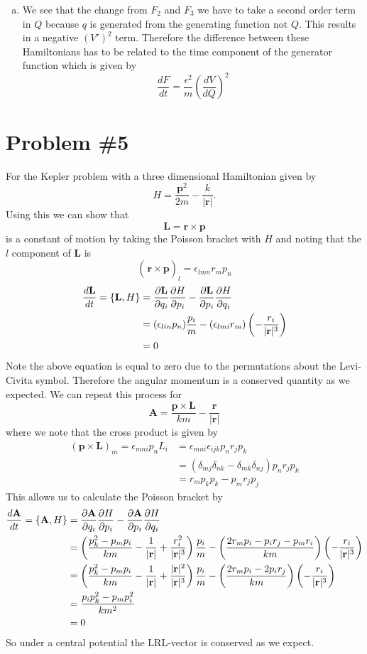 \documentclass[11pt]{article}
\numberwithin{equation}{section}
\begin{document}
\begin{enumerate}[(a)]
\item We see that the change from $F_2$ and $F_3$ we have to take a second order term in $Q$
because $q$ is generated from the generating function not $Q$. This results in a negative 
$(V')^2$ term. Therefore the difference between these Hamiltonians has to be related to the
time component of the generator function which is given by
$$\frac{dF}{dt} = \frac{\epsilon^2}{m}\left(\frac{dV}{dQ}\right)^2$$

\end{enumerate}

\pagebreak

\section{Problem \#5}
For the Kepler problem with a three dimensional Hamiltonian given by
$$H = \frac{\mathbf{p}^2}{2m} - \frac{k}{|\mathbf{r}|}.$$
Using this we can show that 
$$\mathbf{L} = \mathbf{r}\times\mathbf{p}$$
is a constant of motion by taking the Poisson bracket with $H$ and noting that the $l$ 
component of $\mathbf{L}$ is
$$\left(\frac{}{}\mathbf{r}\times\mathbf{p}\right)_{l} = \epsilon_{lmn}r_mp_n$$
\begin{align*}
\frac{d\mathbf{L}}{dt} = \{\mathbf{L},H\} &= \frac{\partial{\mathbf{L}}}{\partial{q_i}}\frac{\partial{H}}{\partial{p_i}} - \frac{\partial{\mathbf{L}}}{\partial{p_i}}\frac{\partial{H}}{\partial{q_i}}\\
&= (\epsilon_{lin}p_n)\frac{p_i}{m} - (\epsilon_{lmi}r_m)\left(-\frac{r_i}{|\mathbf{r}|^3}\right)\\
&= 0
\end{align*}
Note the above equation is equal to zero due to the permutations about the Levi-Civita 
symbol. Therefore the angular momentum is a conserved quantity as we expected. We can repeat
this process for 
$$\mathbf{A} = \frac{\mathbf{p}\times\mathbf{L}}{km} - \frac{\mathbf{r}}{|\mathbf{r}|}$$
where we note that the cross product is given by
\begin{align*}
(\mathbf{p}\times\mathbf{L})_m = \epsilon_{mni}p_nL_i &= \epsilon_{mni}\epsilon_{ijk}p_nr_jp_k \\
&= (\delta_{mj}\delta_{nk}-\delta_{mk}\delta_{nj})p_nr_jp_k\\
&= r_mp_kp_k - p_mr_jp_j
\end{align*}
This allows us to calculate the Poisson bracket by
\begin{align*}
\frac{d\mathbf{A}}{dt} = \{\mathbf{A},H\}  &= \frac{\partial{\mathbf{A}}}{\partial{q_i}}\frac{\partial{H}}{\partial{p_i}} - \frac{\partial{\mathbf{A}}}{\partial{p_i}}\frac{\partial{H}}{\partial{q_i}}\\
&= \left(\frac{p_k^2-p_mp_i}{km} - \frac{1}{|\mathbf{r}|} + \frac{r_i^2}{|\mathbf{r}|^3}\right)\frac{p_i}{m} - \left(\frac{2r_mp_i-p_ir_j-p_mr_i}{km}\right)\left(-\frac{r_i}{|\mathbf{r}|^3}\right)\\
&= \left(\frac{p_k^2-p_mp_i}{km} - \frac{1}{|\mathbf{r}|} + \frac{|\mathbf{r}|^2}{|\mathbf{r}|^3}\right)\frac{p_i}{m} - \left(\frac{2r_mp_i-2p_ir_j}{km}\right)\left(-\frac{r_i}{|\mathbf{r}|^3}\right)\\
&= \frac{p_ip_k^2-p_mp_i^2}{km^2} \\
&= 0
\end{align*}
So under a central potential the LRL-vector is conserved as we expect.
\end{document}
